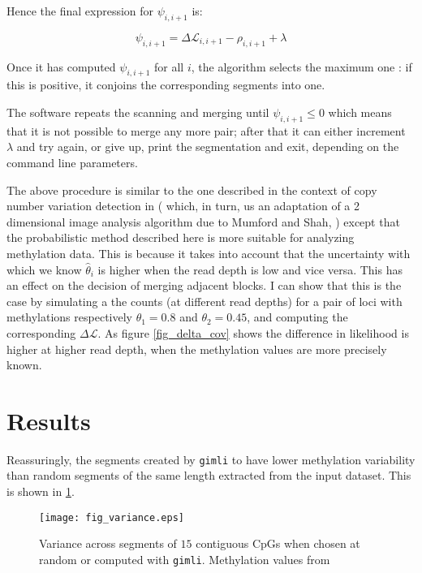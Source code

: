 \documentclass[12pt]{amsart}
\newcommand{\lik}{\ensuremath{\mathcal{L}}}
\newcommand{\gimli}{\texttt{gimli}}
\begin{document}
Hence the final expression for $\psi_{i,i+1}$ is:

\begin{equation}
\psi_{i,i+1} =  \Delta  \lik_{i,i+1}  - \rho_{i,i+1}  +\lambda
\end{equation}

Once it has computed 
$\psi_{i,i+1}$ for all $i$, the algorithm selects the maximum 
one : if this is positive, it conjoins the corresponding segments into one.

The software repeats the scanning and merging until $\psi_{i,i+1} \leq 0$ 
which means that it is not possible to 
merge any more pair; after that it can either increment $\lambda$ and try again, 
or give up, print the segmentation and exit, depending on the command line parameters.

The above procedure is similar to the one
described in the context of copy number variation detection in \cite{vega} 
( which, in turn, us an adaptation 
of a 2 dimensional image analysis algorithm due to Mumford and Shah, 
\cite{mumfordshah}) except that the probabilistic method  described
here is more suitable for analyzing methylation data. This is because it 
takes into account that the
uncertainty with which we know $\hat{\theta}_i$ is higher when the read depth 
is low and vice versa.
This has an effect on the decision of merging adjacent blocks. I can show that 
this is the case by simulating
a the counts (at different read depths) for a pair of loci with 
methylations respectively 
$\theta_1=0.8$ and $\theta_2=0.45$,
and computing the corresponding $\Delta  \lik$.  
As figure \ref{fig_delta_cov} shows the difference in likelihood is higher 
at higher read depth, when the methylation values are more precisely known.

\section{Results}

Reassuringly, the segments created by \gimli{} to have lower methylation
variability than random segments of the same length extracted from the 
input dataset. 
This is shown in \ref{fig_variance}.

\begin{figure}\label{fig_variance}
\texttt{[image: fig\_variance.eps]}
\caption{Variance across segments of $15$ contiguous CpGs when chosen at 
random or 
computed with \gimli{}. Methylation values from }
\end{figure}
\end{document}
